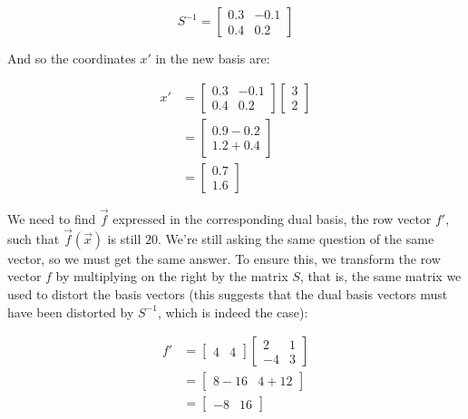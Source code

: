 $$
S^{-1} = \begin{bmatrix}
    0.3 & -0.1 \\
    0.4 & 0.2
\end{bmatrix}
$$

And so the coordinates $x'$ in the new basis are:

\begin{equation}
\begin{split}
x' &= \begin{bmatrix}
    0.3 & -0.1 \\
    0.4 & 0.2
\end{bmatrix} \begin{bmatrix}
    3 \\ 2
\end{bmatrix} \\
  &= \begin{bmatrix}
    0.9 - 0.2 \\ 1.2 + 0.4
\end{bmatrix} \\
  &= \begin{bmatrix}
    0.7 \\ 1.6
\end{bmatrix}
\end{split}
\end{equation}

We need to find $\vec{f}$ expressed in the corresponding dual basis, the row vector $f'$, such that $\vec{f}(\vec{x})$ is still $20$. We're still asking the same question of the same vector, so we must get the same answer. To ensure this, we transform the row vector $f$ by multiplying on the right by the matrix $S$, that is, the same matrix we used to distort the basis vectors (this suggests that the dual basis vectors must have been distorted by $S^{-1}$, which is indeed the case):

\begin{equation}
\begin{split}
f' &= \begin{bmatrix}
    4 & 4
\end{bmatrix} \begin{bmatrix}
    2 & 1 \\
    -4 & 3
\end{bmatrix} \\
  &= \begin{bmatrix}
    8 - 16 & 4 + 12
\end{bmatrix} \\
  &= \begin{bmatrix}
    -8 & 16
\end{bmatrix}
\end{split}
\end{equation}

